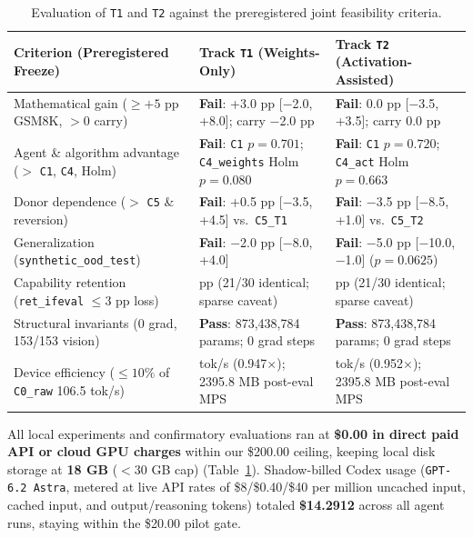 \documentclass[11pt]{article}
\begin{document}
\begin{table}[htbp]
\centering
\caption{Evaluation of \texttt{T1} and \texttt{T2} against the preregistered joint feasibility criteria.}
\label{tab:criteria}
\small
\begin{tabularx}{\textwidth}{@{} >{\raggedright\arraybackslash}p{} >{\raggedright\arraybackslash}X >{\raggedright\arraybackslash}X @{}}
\toprule
Criterion (Preregistered Freeze) & Track \texttt{T1} (Weights-Only) & Track \texttt{T2} (Activation-Assisted) \\
\midrule
Mathematical gain ($\ge +5$ pp GSM8K, $> 0$ carry) & \textbf{Fail}: +3.0 pp [$-$2.0, +8.0]; carry $-$2.0 pp & \textbf{Fail}: 0.0 pp [$-$3.5, +3.5]; carry 0.0 pp \\
Agent \& algorithm advantage ($>$ \texttt{C1}, \texttt{C4}, Holm) & \textbf{Fail}: \texttt{C1} $p=0.701$; \texttt{C4\_weights} Holm $p=0.080$ & \textbf{Fail}: \texttt{C1} $p=0.720$; \texttt{C4\_act} Holm $p=0.663$ \\
Donor dependence ($>$ \texttt{C5} \& reversion) & \textbf{Fail}: +0.5 pp [$-$3.5, +4.5] vs.\ \texttt{C5\_T1} & \textbf{Fail}: $-$3.5 pp [$-$8.5, +1.0] vs.\ \texttt{C5\_T2} \\
Generalization (\texttt{synthetic\_ood\_test}) & \textbf{Fail}: $-$2.0 pp [$-$8.0, +4.0] & \textbf{Fail}: $-$5.0 pp [$-$10.0, $-$1.0] ($p=0.0625$) \\
Capability retention (\texttt{ret\_ifeval} $\le 3$ pp loss) & 0.0 pp (21/30 identical; sparse caveat) & 0.0 pp (21/30 identical; sparse caveat) \\
Structural invariants (0 grad, 153/153 vision) & \textbf{Pass}: 873,438,784 params; 0 grad steps & \textbf{Pass}: 873,438,784 params; 0 grad steps \\
Device efficiency ($\le 10\%$ of \texttt{C0\_raw} 106.5 tok/s) & 100.9 tok/s (0.947$\times$); 2395.8 MB post-eval MPS & 101.4 tok/s (0.952$\times$); 2395.8 MB post-eval MPS \\
\bottomrule
\end{tabularx}
\end{table}

All local experiments and confirmatory evaluations ran at \textbf{\$0.00 in direct paid API or cloud GPU charges} within our \$200.00 ceiling, keeping local disk storage at \textbf{18 GB} ($< 30$ GB cap) (Table~\ref{tab:criteria}). Shadow-billed Codex usage (\texttt{GPT-6.2 Astra}, metered at live API rates of \$8/\$0.40/\$40 per million uncached input, cached input, and output/reasoning tokens) totaled \textbf{\$14.2912} across all agent runs, staying within the \$20.00 pilot gate.
\end{document}
